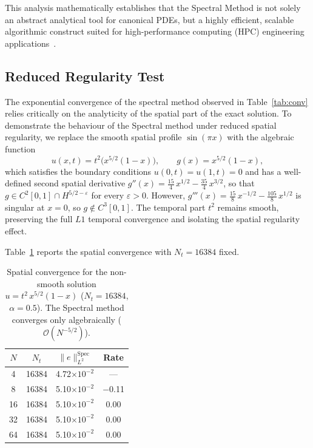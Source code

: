 \documentclass[a4paper,fleqn]{cas-sc}
\begin{document}
This analysis mathematically establishes that the Spectral Method is not solely an abstract analytical tool for canonical PDEs, but a highly efficient, scalable algorithmic construct suited for high-performance computing (HPC) engineering applications~\cite{shiyapov2026high}.

\subsection{Reduced Regularity Test}\label{sec:nonsmooth}

The exponential convergence of the spectral method observed in Table~\ref{tab:conv} relies critically on the analyticity of the spatial part of the exact solution. To demonstrate the behaviour of the Spectral method under reduced spatial regularity, we replace the smooth spatial profile $\sin(\pi x)$ with the algebraic function
\begin{equation}\label{eq:nonsmooth}
  u(x,t) = t^2 \bigl(x^{5/2}(1-x)\bigr), \qquad
  g(x) = x^{5/2}(1-x),
\end{equation}
which satisfies the boundary conditions $u(0,t) = u(1,t) = 0$ and has a well-defined second spatial derivative $g''(x) = \tfrac{15}{4}\,x^{1/2} - \tfrac{35}{4}\,x^{3/2}$, so that $g \in C^2[0,1] \cap H^{5/2-\varepsilon}$ for every $\varepsilon > 0$. However, $g'''(x) = \tfrac{15}{8}\,x^{-1/2} - \tfrac{105}{8}\,x^{1/2}$ is singular at $x = 0$, so $g \notin C^3[0,1]$. The temporal part $t^2$ remains smooth, preserving the full $L1$ temporal convergence and isolating the spatial regularity effect.

Table~\ref{tab:nonsmooth} reports the spatial convergence with $N_t = 16384$ fixed.

\begin{table}[H]
\centering
\caption{Spatial convergence for the non-smooth solution $u = t^2\,x^{5/2}(1-x)$ ($N_t = 16384$, $\alpha = 0.5$). The Spectral method converges only algebraically ($\mathcal{O}(N^{-5/2})$).}
\label{tab:nonsmooth}
\begin{tabular}{cccc}
\toprule
$N$ & $N_t$ & $\|e\|_{L^2}^{\text{Spec}}$ & Rate \\
\midrule
 4  & 16384 & 4.72$\times 10^{-2}$ & --- \\
 8  & 16384 & 5.10$\times 10^{-2}$ & $-$0.11 \\
16  & 16384 & 5.10$\times 10^{-2}$ & 0.00 \\
32  & 16384 & 5.10$\times 10^{-2}$ & 0.00 \\
64  & 16384 & 5.10$\times 10^{-2}$ & 0.00 \\
\bottomrule
\end{tabular}
\end{table}
\end{document}
